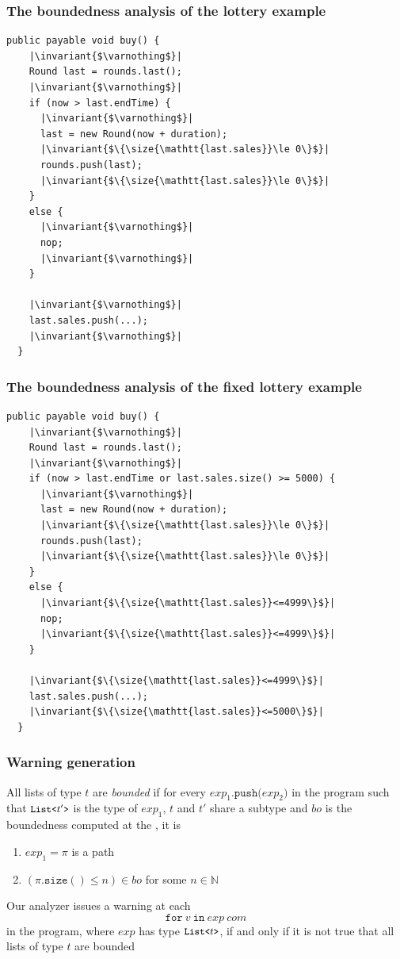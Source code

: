 \documentclass[11pt]{beamer}  %
\def\|#1|{\mathid{#1}}
\newcommand{\mathid}[1]{\ensuremath{\mathit{#1}}}
\def\codesize{\small}
\def\<#1>{\codeid{#1}}
\newcommand{\codeid}[1]{\ifmmode{\mbox{\codesize\ttfamily{#1}}}\else{\codesize\ttfamily #1}\fi}
\renewcommand{\exp}{\|exp|}
\newcommand{\com}{\|com|}
\newcommand{\size}[1]{{#1}\mathtt{.size()}}
\newcommand{\push}[2]{{#1}\mathtt{.push(}{#2}\mathtt{)}}
\newcommand{\for}[3]{\mathtt{for\ }{#1}\mathtt{\ in\ }{#2}\ {#3}}
\newcommand{\nat}{\mathbb{N}}
\newcommand{\invariant}[1]{\color{magenta}{#1}}
\begin{document}
\begin{frame}[fragile]\frametitle{The boundedness analysis of the lottery example}
  \begin{lstlisting}[language=pseudo,numbers=none]
  public payable void buy() {
    |\invariant{$\varnothing$}|
    Round last = rounds.last();
    |\invariant{$\varnothing$}|
    if (now > last.endTime) {
      |\invariant{$\varnothing$}|
      last = new Round(now + duration);
      |\invariant{$\{\size{\mathtt{last.sales}}\le 0\}$}|
      rounds.push(last);
      |\invariant{$\{\size{\mathtt{last.sales}}\le 0\}$}|
    }
    else {
      |\invariant{$\varnothing$}|
      nop;
      |\invariant{$\varnothing$}|
    }

    |\invariant{$\varnothing$}|
    last.sales.push(...);
    |\invariant{$\varnothing$}|
  }
  \end{lstlisting}
\end{frame}

\begin{frame}[fragile]\frametitle{The boundedness analysis of the fixed lottery example}
  \begin{lstlisting}[language=pseudo,numbers=none]
  public payable void buy() {
    |\invariant{$\varnothing$}|
    Round last = rounds.last();
    |\invariant{$\varnothing$}|
    if (now > last.endTime or last.sales.size() >= 5000) {
      |\invariant{$\varnothing$}|
      last = new Round(now + duration);
      |\invariant{$\{\size{\mathtt{last.sales}}\le 0\}$}|
      rounds.push(last);
      |\invariant{$\{\size{\mathtt{last.sales}}\le 0\}$}|
    }
    else {
      |\invariant{$\{\size{\mathtt{last.sales}}<=4999\}$}|
      nop;
      |\invariant{$\{\size{\mathtt{last.sales}}<=4999\}$}|
    }

    |\invariant{$\{\size{\mathtt{last.sales}}<=4999\}$}|
    last.sales.push(...);
    |\invariant{$\{\size{\mathtt{last.sales}}<=5000\}$}|
  }
  \end{lstlisting}
\end{frame}

\begin{frame}\frametitle{Warning generation}

  All lists of type $t$ are \emph{bounded}
  if for every $\push{\exp_1}{\exp_2}$ in the program such that
  $\<List<$t'$\texttt{>}>$ is the type of $\exp_1$,
  $t$ and $t'$ share a subtype and $\|bo|$ is the boundedness computed
  at the \<push>, it is
  \begin{enumerate}
  \item $\exp_1=\pi$ is a path
  \item $(\size{\pi}\le n)\in\|bo|$ for some $n\in\nat$
  \end{enumerate}

  \medskip

  \begin{mdframed}[backgroundcolor=blue!20] 
  Our analyzer issues a warning at each
  \[
  \for{v}{\exp}{\com}
  \]
  in the program, where
  $\exp$ has type $\<List<$t$\texttt{>}>$, if and only if it is not true that
  all lists of type $t$ are bounded
  \end{mdframed}
  
\end{frame}
\end{document}
